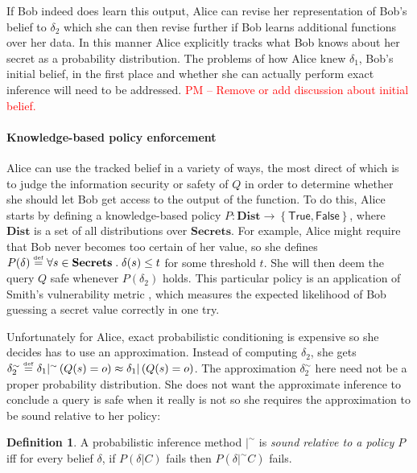 \documentclass{article} %
\newcommand{\pxm}[1]{\textcolor{red}{PM -- #1}}
\newcommand{\ra}{\rightarrow}
\newcommand{\secrets}[0]{\textbf{Secrets}}
\newcommand{\asecret}[0]{s}
\newcommand{\rsecret}[0]{s}
\newcommand{\dists}[0]{\textbf{Dist}}
\newcommand{\sconst}[1]{\ensuremath{\mathsf{#1}}}
\newcommand{\strue}{\sconst{True}}
\newcommand{\sfalse}{\sconst{False}}
\newcommand{\paren}[1]{\left( #1 \right)}
\newcommand{\set}[1]{\left\{ #1 \right\}}
\newcommand{\acond}[0]{|^\sim}
\newcommand{\qsep}[0]{\; . \;}
\newcommand{\stacklabel}[1]{\stackrel{\smash{\scriptscriptstyle \mathrm{#1}}}}
\newcommand{\defeq}{\stacklabel{def}=}
\theoremstyle{plain} %
\theoremstyle{definition} %
\newtheorem*{definition-un}{Definition}
\begin{document}
If Bob indeed does learn this output, Alice can revise her
representation of Bob's belief to $ \delta_2 $ which she can then
revise further if Bob learns additional functions over her data. In
this manner Alice explicitly tracks what Bob knows about her secret
as a probability distribution. The problems of how Alice knew $
\delta_1 $, Bob's initial belief, in the first place and whether she
can actually perform exact inference will need to be
addressed. \pxm{Remove or add discussion about initial belief.}

\paragraph*{Knowledge-based policy enforcement}

Alice can use the tracked belief in a variety of ways, the most direct
of which is to judge the information security or safety of $ Q $ in
order to determine whether she should let Bob get access to the output
of the function. To do this, Alice starts by defining a
knowledge-based policy $ P : \dists \ra \set{\strue,\sfalse} $, where
$ \dists $ is a set of all distributions over $ \secrets $. For
example, Alice might require that Bob never becomes too certain of her
value, so she defines $ P(\delta) \defeq \forall \asecret \in \secrets \qsep
\delta(\asecret) \leq t $ for some threshold $ t $. She will then deem the
query $ Q $ safe whenever $ P(\delta_2) $ holds. This particular
policy is an application of Smith's vulnerability metric
\cite{smith09foundations}, which measures the expected likelihood of
Bob guessing a secret value correctly in one try.

Unfortunately for Alice, exact probabilistic conditioning is expensive
so she decides has to use an approximation. Instead of computing $
\delta_2 $, she gets $ \delta_2^\sim \defeq \delta_1 \acond
\paren{Q(\rsecret) = o} \approx \delta_1 | \paren{Q(\rsecret) = o} $. The
approximation $ \delta_2^\sim $ here need not be a proper probability
distribution. She does not want the approximate inference to conclude
a query is safe when it really is not so she requires the
approximation to be sound relative to her policy:

\begin{definition-un} A probabilistic inference method $ |^\sim $ is
  \emph{sound relative to a policy $ P $} iff for every belief $
  \delta $, if $ P(\delta | C) $ fails then $ P(\delta |^\sim C) $
  fails.
\end{definition-un}
\end{document}
